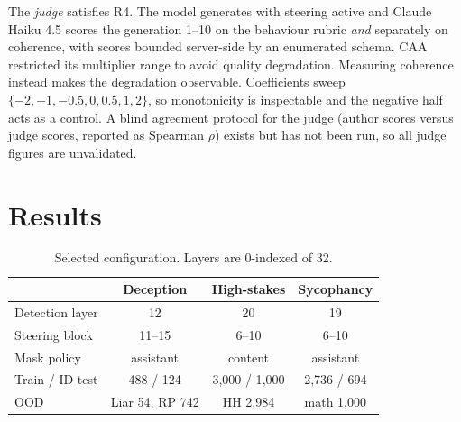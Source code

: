 \documentclass[conference]{IEEEtran}
\begin{document}
The \emph{judge} satisfies R4. The model generates with steering active and Claude
Haiku 4.5 scores the generation 1--10 on the behaviour rubric \emph{and}
separately on coherence, with scores bounded server-side by an enumerated schema.
CAA restricted its multiplier range to avoid quality degradation. Measuring
coherence instead makes the degradation observable.
Coefficients sweep $\{-2,-1,-0.5,0,0.5,1,2\}$, so monotonicity is inspectable and
the negative half acts as a control. A blind agreement protocol for the judge
(author scores versus judge scores, reported as Spearman $\rho$) exists but has not
been run, so all judge figures are unvalidated.

\section{Results}
\label{sec:results}

\begin{table}[t]
\caption{Selected configuration. Layers are 0-indexed of 32.}
\label{tab:config}
\centering
\small
\setlength{\tabcolsep}{3.5pt}
\begin{tabular}{lccc}
\toprule
& \textbf{Deception} & \textbf{High-stakes} & \textbf{Sycophancy} \\
\midrule
Detection layer & 12 & 20 & 19 \\
Steering block  & 11--15 & 6--10 & 6--10 \\
Mask policy & assistant & content & assistant \\
Train / ID test & 488 / 124 & 3{,}000 / 1{,}000 & 2{,}736 / 694 \\
OOD & Liar 54, RP 742 & HH 2{,}984 & math 1{,}000 \\
\bottomrule
\end{tabular}
\end{table}
\end{document}
